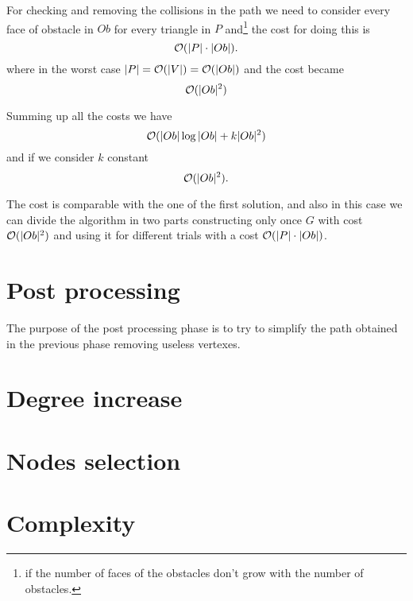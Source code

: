 \documentclass[dissertation.tex]{subfiles}
\begin{document}
For checking and removing the collisions in the path we need to
consider every face of obstacle in $Ob$ for every
triangle in $P$ and\footnote{if the
  number of faces of the obstacles don't grow with the number of
  obstacles.} the cost for doing this is
\begin{equation*}
  \mathcal{O}(|P|\cdot|Ob|).
\end{equation*}
where in the worst case $|P|=\mathcal{O}(|V|)=\mathcal{O}(|Ob|)$ and the cost
became
\begin{equation*}
  \mathcal{O}(|Ob|^2)
\end{equation*}

Summing up all the costs we have 
\begin{equation*}
  \mathcal{O}(|Ob|\log|Ob|+k|Ob|^2)
\end{equation*}
and if we consider $k$ constant
\begin{equation*}
  \mathcal{O}(|Ob|^2).
\end{equation*}

The cost is comparable with the one of the first solution, and also in
this case we can divide the algorithm in two parts constructing only
once $G$ with cost $\mathcal{O}(|Ob|^2)$ and using it for different
trials with a cost $\mathcal{O}(|P|\cdot|Ob|)$.

\section{Post processing}\label{sec:postPro}
The purpose of the post processing phase is to try to simplify the
path obtained in the previous phase removing useless vertexes.
\section{Degree increase}\label{sec:degreeInc}
\section{Nodes selection}\label{sec:nodeSel}
\section{Complexity}
\end{document}
